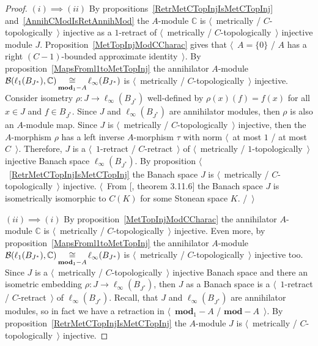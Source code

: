 \begin{proof} $(i)\implies (ii)$ By 
propositions~\ref{RetrMetCTopInjIsMetCTopInj} and~\ref{AnnihCModIsRetAnnihMod} 
the $A$-module $\mathbb{C}$ is
$\langle$~metrically / $C$-topologically~$\rangle$ injective as a $1$-retract of
$\langle$~metrically / $C$-topologically~$\rangle$ injective module $J$.
Proposition~\ref{MetTopInjModCCharac} gives that $\langle$~$A= \{0 \}$ / $A$ has
a right $(C-1)$-bounded approximate identity~$\rangle$. By
proposition~\ref{MapsFroml1toMetTopInj} the annihilator $A$-module
$\mathcal{B}(\ell_1(B_{J^*}),\mathbb{C})
\mathop{\mathbin{\cong}}\limits_{\mathbf{mod}_1-A}
\ell_\infty(B_{J^*})$ is $\langle$~metrically / $C$-topologically~$\rangle$ 
injective. Consider isometry $\rho:J\to\ell_\infty(B_{J^*})$ 
well-defined by $\rho(x)(f)=f(x)$ for all $x\in J$ and $f\in B_{J^*}$. 
Since $J$ and $\ell_\infty(B_{J^*})$ are  annihilator modules, 
then $\rho$ is also an $A$-module map. 
Since $J$ is $\langle$~metrically / $C$-topologically~$\rangle$ injective, 
then the $A$-morphism $\rho$ has a left inverse $A$-morphism $\tau$ with 
norm $\langle$~at most $1$ / at most $C$~$\rangle$.
Therefore, $J$ is a $\langle$~$1$-retract / $C$-retract~$\rangle$ of
$\langle$~metrically / $1$-topologically~$\rangle$ injective Banach space
$\ell_\infty(B_{J^*})$. By 
proposition $\langle$~\ref{RetrMetCTopInjIsMetCTopInj} the Banach space $J$ is
$\langle$~metrically / $C$-topologically~$\rangle$ injective. $\langle$~From
[\cite{LaceyIsomThOfClassicBanSp}, theorem 3.11.6] the Banach space $J$ is
isometrically isomorphic to $C(K)$ for some Stonean space $K$. /~$\rangle$ 

$(ii)\implies (i)$ By proposition~\ref{MetTopInjModCCharac} the annihilator
$A$-module $\mathbb{C}$ is $\langle$~metrically / $C$-topologically~$\rangle$
injective. Even more, by proposition~\ref{MapsFroml1toMetTopInj} 
the annihilator $A$-module
$\mathcal{B}(\ell_1(B_{J^*}),\mathbb{C})
\mathop{\mathbin{\cong}}\limits_{\mathbf{mod}_1-A}
\ell_\infty(B_{J^*})$ is $\langle$~metrically / $C$-topologically~$\rangle$ 
injective too. Since $J$ is a $\langle$~metrically / $C$-topologically~$\rangle$
injective Banach space and there an isometric 
embedding $\rho:J\to \ell_\infty(B_{J^*})$, then $J$ as a
Banach space is a $\langle$~$1$-retract / $C$-retract~$\rangle$ of
$\ell_\infty(B_{J^*})$. Recall, that $J$ and $\ell_\infty(B_{J^*})$ are
annihilator modules, so in fact we have a retraction in
$\langle$~$\mathbf{mod}_1-A$ / $\mathbf{mod}-A$~$\rangle$. By 
proposition~\ref{RetrMetCTopInjIsMetCTopInj} the $A$-module $J$ 
is $\langle$~metrically / $C$-topologically~$\rangle$ injective.
\end{proof}

